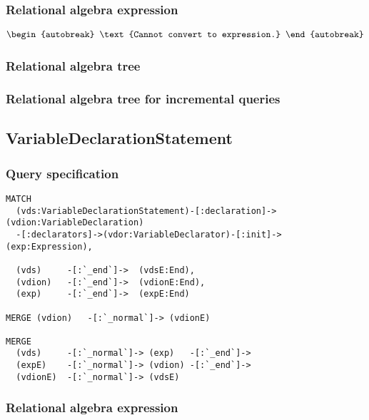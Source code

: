 \subsubsection*{Relational algebra expression}

\begin{align*}
\begin{autobreak}
\text{Cannot convert to expression.}
\end{autobreak}
\end{align*}

\subsubsection*{Relational algebra tree}


\subsubsection*{Relational algebra tree for incremental queries}

\subsection{VariableDeclarationStatement}

\subsubsection*{Query specification}

\begin{lstlisting}
MATCH
  (vds:VariableDeclarationStatement)-[:declaration]->(vdion:VariableDeclaration)
  -[:declarators]->(vdor:VariableDeclarator)-[:init]->(exp:Expression),

  (vds)     -[:`_end`]->  (vdsE:End),
  (vdion)   -[:`_end`]->  (vdionE:End),
  (exp)     -[:`_end`]->  (expE:End)

MERGE (vdion)   -[:`_normal`]-> (vdionE)

MERGE
  (vds)     -[:`_normal`]-> (exp)   -[:`_end`]->
  (expE)    -[:`_normal`]-> (vdion) -[:`_end`]->
  (vdionE)  -[:`_normal`]-> (vdsE)
\end{lstlisting}

\subsubsection*{Relational algebra expression}

